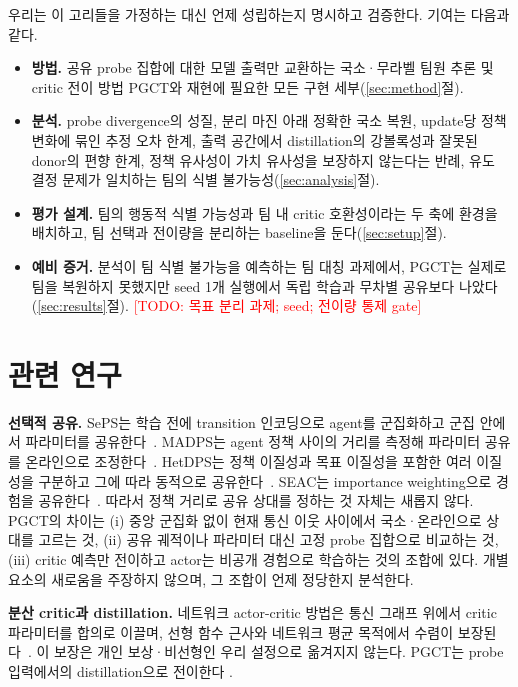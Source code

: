 \documentclass[twocolumn,10pt]{article}
\theoremstyle{remark}
\newcommand{\todo}[1]{\textcolor{red}{[TODO: #1]}}
\newcommand{\ours}{PGCT}
\begin{document}
우리는 이 고리들을 가정하는 대신 언제 성립하는지 명시하고 검증한다. 기여는 다음과 같다.
\begin{itemize}
  \item \textbf{방법.} 공유 probe 집합에 대한 모델 출력만 교환하는 국소·무라벨 팀원 추론 및 critic 전이 방법 \ours{}와 재현에 필요한 모든 구현 세부(\ref{sec:method}절).
  \item \textbf{분석.} probe divergence의 성질, 분리 마진 아래 정확한 국소 복원, update당 정책 변화에 묶인 추정 오차 한계, 출력 공간에서 distillation의 강볼록성과
    잘못된 donor의 편향 한계, 정책 유사성이 가치 유사성을 보장하지 않는다는 반례, 유도 결정 문제가 일치하는 팀의 식별 불가능성(\ref{sec:analysis}절).
  \item \textbf{평가 설계.} 팀의 행동적 식별 가능성과 팀 내 critic 호환성이라는 두 축에 환경을 배치하고, 팀 선택과 전이량을 분리하는 baseline을 둔다(\ref{sec:setup}절).
  \item \textbf{예비 증거.} 분석이 팀 식별 불가능을 예측하는 팀 대칭 과제에서, \ours{}는 실제로 팀을 복원하지 못했지만 seed 1개 실행에서 독립 학습과 무차별
    공유보다 나았다(\ref{sec:results}절). \todo{목표 분리 과제; seed; 전이량 통제 gate}
\end{itemize}

\section{관련 연구}
\textbf{선택적 공유.} SePS는 학습 전에 transition 인코딩으로 agent를 군집화하고 군집 안에서 파라미터를 공유한다~\cite{christianos2021seps}. MADPS는 agent 정책 사이의
거리를 측정해 파라미터 공유를 온라인으로 조정한다~\cite{hu2024madps}. HetDPS는 정책 이질성과 목표 이질성을 포함한 여러 이질성을 구분하고 그에 따라 동적으로
공유한다~\cite{hu2026hetdps}. SEAC는 importance weighting으로 경험을 공유한다~\cite{christianos2020seac}. 따라서 정책 거리로 공유 상대를 정하는 것 자체는 새롭지 않다.
\ours{}의 차이는 (i) 중앙 군집화 없이 현재 통신 이웃 사이에서 국소·온라인으로 상대를 고르는 것, (ii) 공유 궤적이나 파라미터 대신 고정 probe 집합으로 비교하는 것,
(iii) critic 예측만 전이하고 actor는 비공개 경험으로 학습하는 것의 조합에 있다. 개별 요소의 새로움을 주장하지 않으며, 그 조합이 언제 정당한지 분석한다.

\textbf{분산 critic과 distillation.} 네트워크 actor-critic 방법은 통신 그래프 위에서 critic 파라미터를 합의로 이끌며, 선형 함수 근사와 네트워크 평균 목적에서 수렴이
보장된다~\cite{zhang2018networked}. 이 보장은 개인 보상·비선형인 우리 설정으로 옮겨지지 않는다. \ours{}는 probe 입력에서의 distillation으로 전이한다
\cite{rusu2016policy}.
\end{document}
